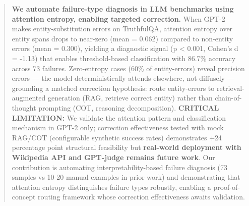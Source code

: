 \begin{abstract}
\textbf{We automate failure-type diagnosis in LLM benchmarks using attention entropy, enabling targeted correction.} When GPT-2 makes entity-substitution errors on TruthfulQA, attention entropy over entity spans drops to near-zero (mean = 0.062) compared to non-entity errors (mean = 0.300), yielding a diagnostic signal (p < 0.001, Cohen's d = -1.13) that enables threshold-based classification with 86.7\% accuracy across 73 failures. Zero-entropy cases (60\% of entity-errors) reveal precision errors --- the model deterministically attends elsewhere, not diffusely --- grounding a matched correction hypothesis: route entity-errors to retrieval-augmented generation (RAG, retrieve correct entity) rather than chain-of-thought prompting (COT, reasoning decomposition). \textbf{CRITICAL LIMITATION:} We validate the attention pattern and classification mechanism in GPT-2 only; correction effectiveness tested with mock RAG/COT (configurable synthetic success rates) demonstrates +24 percentage point structural feasibility but \textbf{real-world deployment with Wikipedia API and GPT-judge remains future work}. Our contribution is automating interpretability-based failure diagnosis (73 samples vs 10-20 manual examples in prior work) and demonstrating that attention entropy distinguishes failure types robustly, enabling a proof-of-concept routing framework whose correction effectiveness awaits validation.
\end{abstract}
